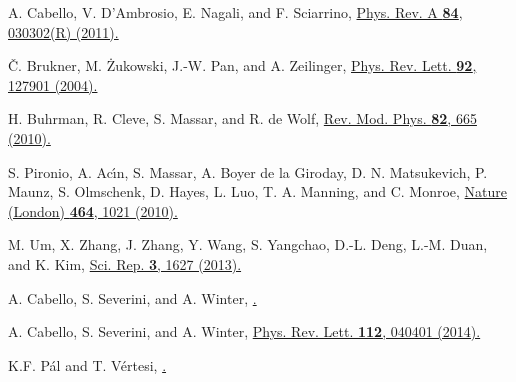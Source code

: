 \documentclass[pra,letterpaper,english,preprint,nofootinbib,aps,superscriptaddress,showkeys]{revtex4-1}
\theoremstyle{definition}
\theoremstyle{remark}
\begin{document}
\begin{thebibliography}{10}
 A. Cabello, V. D'Ambrosio, E. Nagali, and F. Sciarrino,
 \href{http://journals.aps.org/pra/abstract/10.1103/PhysRevA.84.030302}{Phys. Rev. A \textbf{84}, 030302(R) (2011).}


 \v{C}. Brukner, M. \.{Z}ukowski, J.-W. Pan, and A. Zeilinger,
 \href{http://journals.aps.org/prl/abstract/10.1103/PhysRevLett.92.127901}{Phys. Rev. Lett. \textbf{92}, 127901 (2004).}

 H. Buhrman, R. Cleve, S. Massar, and R. de Wolf,
 \href{http://journals.aps.org/rmp/abstract/10.1103/RevModPhys.82.665}{Rev. Mod. Phys. \textbf{82}, 665 (2010).}


 S. Pironio, A. Ac\'{\i}n, S. Massar, A. Boyer de la Giroday,
 D. N. Matsukevich, P. Maunz, S. Olmschenk, D. Hayes, L. Luo, T. A. Manning, and C. Monroe,
 \href{http://www.nature.com/nature/journal/v464/n7291/full/nature09008.html}{Nature (London) \textbf{464}, 1021 (2010).}

 M. Um, X. Zhang, J. Zhang, Y. Wang, S. Yangchao, D.-L. Deng, L.-M. Duan, and K. Kim,
 \href{http://www.nature.com/srep/2013/130409/srep01627/full/srep01627.html}{Sci. Rep. \textbf{3}, 1627 (2013).}



 A. Cabello, S. Severini, and A. Winter,
 \href{http://arxiv.org/abs/1010.2163}{.}

 A. Cabello, S. Severini, and A. Winter,
 \href{http://journals.aps.org/prl/abstract/10.1103/PhysRevLett.112.040401}{Phys. Rev. Lett. \textbf{112}, 040401 (2014).}
 
 K.F. P\'al and T. V\'ertesi,
 \href{https://dx.doi.org/10.1103/PhysRevA.82.022116}{.}
 

\end{thebibliography}
\end{document}

